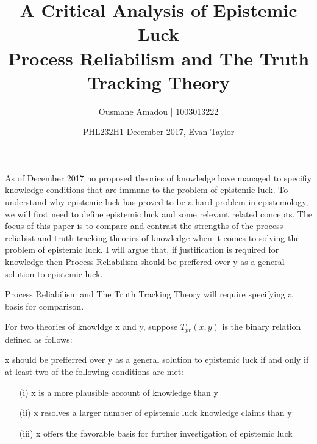 \documentclass{article}
\title{%
  A Critical Analysis of Epistemic Luck \\
  \large Process Reliabilism and The Truth Tracking Theory }
\author{Ousmane Amadou | 1003013222}
\date{PHL232H1 December 2017, Evan Taylor}
\begin{document}
\maketitle

As of December 2017 no proposed theories of knowledge have managed
to specifiy knowledge conditions that are immune to the problem of
epistemic luck. To understand why epistemic luck has proved to be a
hard problem in epistemology, we will first need to define epistemic
luck and some relevant related concepts. The focus of this paper is
to compare and contrast the strengths of the process reliabist and
truth tracking theories of knowledge when it comes to solving the problem
of epistemic luck. I will argue that, if justification is required for
knowledge then Process Reliabilism should be preffered over y as a general
solution to epistemic luck.

Process Reliabilism and The Truth Tracking Theory will require
specifying a basis for comparison.

For two theories of knowldge x and y, suppose $T_{pr}(x, y)$ is the binary
relation defined as follows:
\begin{center}
    x should be prefferred over y as a general solution to epistemic luck
    if and only if at least two of the following conditions are met:
    \begin{enumerate}
        \item[(i)] x is a more plausible account of knowledge than y
        \item[(ii)] x resolves a larger number of epistemic luck knowledge claims than y
        \item[(iii)] x offers the favorable basis for further investigation of epistemic luck
    \end{enumerate}
\end{center}





\end{document}
